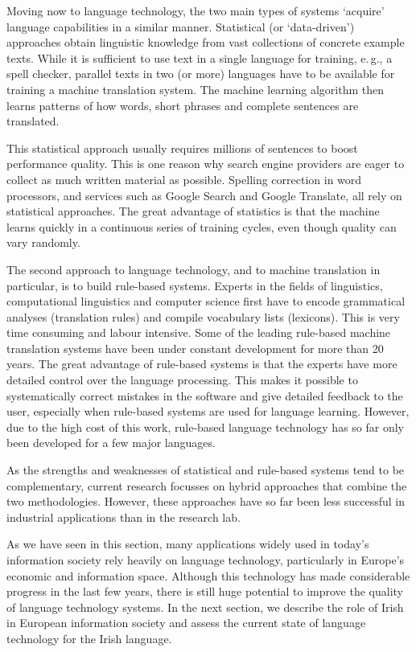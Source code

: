 \begin{multicols}{2}
Moving now to language technology, the two main types of systems `acquire' language capabilities in a similar manner. Statistical (or `data-driven') approaches obtain linguistic knowledge from vast collections of concrete example texts. While it is sufficient to use text in a single language for training, e.\,g., a spell checker, parallel texts in two (or more) languages have to be available for training a machine translation system. The machine learning algorithm then learns patterns of how words, short phrases and complete sentences are translated. 

This statistical approach usually requires millions of sentences to boost performance quality. This is one reason why search engine providers are eager to collect as much written material as possible. Spelling correction in word processors, and services such as Google Search and Google Translate, all rely on statistical approaches. The great advantage of statistics is that the machine learns quickly in a continuous series of training cycles, even though quality can vary randomly.

The second approach to language technology, and to machine translation in particular, is to build rule-based systems. Experts in the fields of linguistics, computational linguistics and computer science first have to encode grammatical analyses (translation rules) and compile vocabulary lists (lexicons). This is very time consuming and labour intensive. Some of the leading rule-based machine translation systems have been under constant development for more than 20 years. The great advantage of rule-based systems is that the experts have more detailed control over the language processing. This makes it possible to systematically correct mistakes in the software and give detailed feedback to the user, especially when rule-based systems are used for language learning. However, due to the high cost of this work, rule-based language technology has so far only been developed for a few major languages. 


As the strengths and weaknesses of statistical and rule-based systems tend to be complementary, current research focusses on hybrid approaches that combine the two methodologies. However, these approaches have so far been less successful in industrial applications than in the research lab. 

As we have seen in this section, many applications widely used in today's information society rely heavily on language technology, particularly in Europe's economic and information space. Although this technology has made considerable progress in the last few years, there is still huge potential to improve the quality of language technology systems. In the next section, we describe the role of Irish in European information society and assess the current state of language technology for the Irish language.
\end{multicols}

